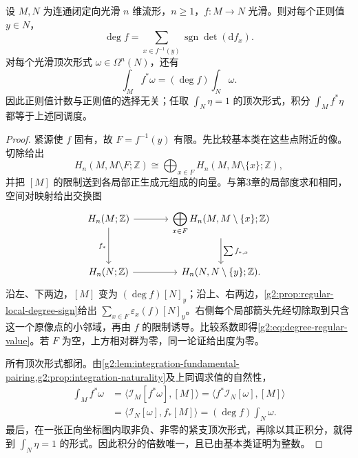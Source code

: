 \begin{theorem}\label{g2:thm:degree-comparison}
	设 \(M,N\) 为连通闭定向光滑 \(n\) 维流形，\(n\ge1\)，\(f:M\to N\) 光滑。则对每个正则值 \(y\in N\)，
	\begin{equation}\label{g2:eq:degree-regular-value}
		\deg f=\sum_{x\in f^{-1}(y)}\operatorname{sgn}\det(\mathrm{d}f_x).
	\end{equation}
	对每个光滑顶次形式 \(\omega\in\Omega^n(N)\)，还有
	\begin{equation}\label{g2:eq:degree-integral}
		\int_M f^*\omega=(\deg f)\int_N\omega.
	\end{equation}
	因此正则值计数与正则值的选择无关；任取 \(\int_N\eta=1\) 的顶次形式，积分 \(\int_Mf^*\eta\) 都等于上述同调度。
\end{theorem}
\begin{proof}
	紧源使 \(f\) 固有，故 \(F=f^{-1}(y)\) 有限。先比较基本类在这些点附近的像。切除给出
	\[
		H_n(M,M\setminus F;\mathbb Z)
		\cong\bigoplus_{x\in F}H_n(M,M\setminus\{x\};\mathbb Z),
	\]
	并把 \([M]\) 的限制送到各局部正生成元组成的向量。与第3章的局部度求和相同，空间对映射给出交换图
	\[
		\begin{tikzcd}[column sep=large,row sep=large]
			H_n(M;\mathbb Z) \arrow[r] \arrow[d,"f_*"'] & \displaystyle\bigoplus_{x\in F}H_n(M,M\setminus\{x\};\mathbb Z) \arrow[d,"\sum f_{*,x}"] \\
			H_n(N;\mathbb Z) \arrow[r] & H_n(N,N\setminus\{y\};\mathbb Z).
		\end{tikzcd}
	\]
	沿左、下两边，\([M]\) 变为 \((\deg f)[N]_y\)；沿上、右两边，\cref{g2:prop:regular-local-degree-sign}给出 \(\sum_{x\in F}\varepsilon_x(f)[N]_y\)。右侧每个局部箭头先经切除取到只含这一个原像点的小邻域，再由 \(f\) 的限制诱导。比较系数即得\eqref{g2:eq:degree-regular-value}。若 \(F\) 为空，上方相对群为零，同一论证给出度为零。

	所有顶次形式都闭。由\cref{g2:lem:integration-fundamental-pairing,g2:prop:integration-naturality}及上同调求值的自然性，
	\begin{align*}
		\int_Mf^*\omega
		&=\bigl\langle\mathcal I_M[f^*\omega],[M]\bigr\rangle
		=\bigl\langle f^*\mathcal I_N[\omega],[M]\bigr\rangle\\
		&=\bigl\langle\mathcal I_N[\omega],f_*[M]\bigr\rangle
		=(\deg f)\int_N\omega.
	\end{align*}
	最后，在一张正向坐标图内取非负、非零的紧支顶次形式，再除以其正积分，就得到 \(\int_N\eta=1\) 的形式。因此积分的倍数唯一，且已由基本类证明为整数。
\end{proof}

